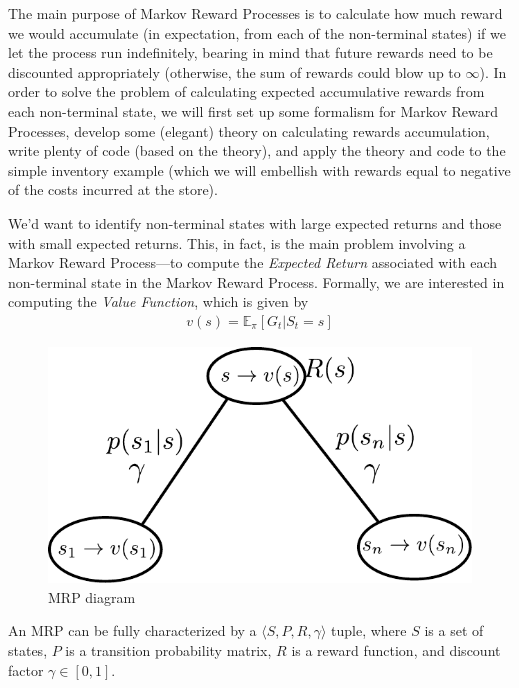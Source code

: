 The main purpose of Markov Reward Processes is to calculate how much reward we would accumulate (in expectation, from each of the non-terminal states) if we let the process run indefinitely, bearing in mind that future rewards need to be discounted appropriately (otherwise, the sum of rewards could blow up to $\infty$). In order to solve the problem of calculating expected accumulative rewards from each non-terminal state, we will first set up some formalism for Markov Reward Processes, develop some (elegant) theory on calculating rewards accumulation, write plenty of code (based on the theory), and apply the theory and code to the simple inventory example (which we will embellish with rewards equal to negative of the costs incurred at the store).


We'd want to identify non-terminal states with large expected returns and those with small expected returns. This, in fact, is the main problem involving a Markov Reward Process—to compute the \textit{Expected Return} associated with each non-terminal state in the Markov Reward Process. Formally, we are interested in computing the \textit{Value Function}, which is given by
\begin{align*}
	v(s)=\mathbb{E}_\pi[G_t|S_t=s]
\end{align*} 

\begin{figure}[t]
	\centering
	\includegraphics[scale=0.6]{./images/mrp.pdf}
	\caption{MRP diagram}
	\label{fig:mrp_diagram}
\end{figure}
An MRP can be fully characterized by a $\langle S,P,R,\gamma \rangle$ tuple, where $S$ is a set of states, $P$ is a transition probability matrix, $R$ is a reward function, and discount factor $\gamma\in[0,1]$.

